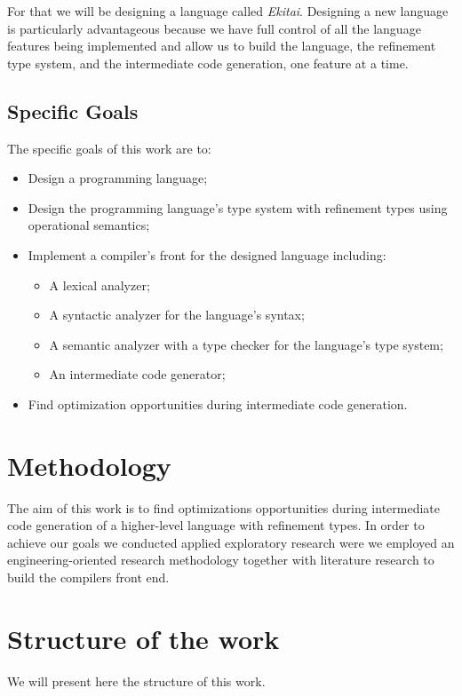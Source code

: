 \documentclass[
    oneside,
    english,
    embeddedlogo,
    noabntexcite
]{ufsc-thesis-rn46-2019}
\begin{document}
For that we will be designing a language called \textit{Ekitai}.
Designing a new language is particularly advantageous because we have full control of all the language features being implemented and allow us to build the language, the refinement type system, and the intermediate code generation, one feature at a time.

\subsection{Specific Goals}
The specific goals of this work are to:
\begin{itemize}
    \item Design a programming language;
    \item Design the programming language's type system with refinement types using operational semantics;
    \item Implement a compiler's front for the designed language including:
    \begin{itemize}
        \item A lexical analyzer;
        \item A syntactic analyzer for the language's syntax;
        \item A semantic analyzer with a type checker for the language's type system;
        \item An intermediate code generator;
    \end{itemize}
    \item Find optimization opportunities during intermediate code generation.
\end{itemize}

\section{Methodology}

The aim of this work is to find optimizations opportunities during intermediate code generation of a higher-level language with refinement types. In order to achieve our goals we conducted applied exploratory research were we employed an engineering-oriented research methodology together with literature research to build the compilers front end.

\section{Structure of the work}

We will present here the structure of this work.
\end{document}
